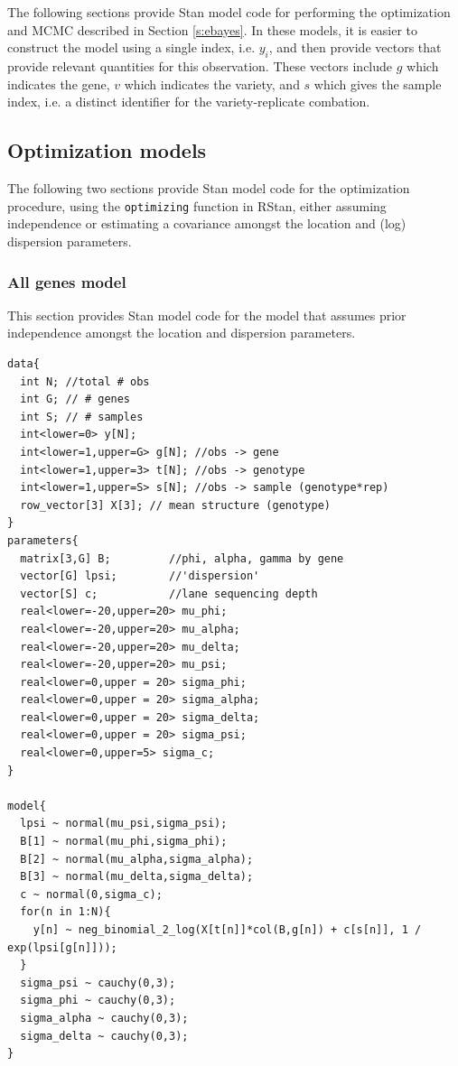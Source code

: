 \documentclass[useAMS,usenatbib,referee]{biom}
\begin{document}



\appendix


\section{}

The following sections provide Stan model code for performing the optimization and MCMC described in Section \ref{s:ebayes}. In these models, it is easier to construct the model using a single index, i.e. $y_i$, and then provide vectors that provide relevant quantities for this observation. These vectors include $g$ which indicates the gene, $v$ which indicates the variety, and $s$ which gives the sample index, i.e. a distinct identifier for the variety-replicate combation. 

\subsection{Optimization models}

The following two sections provide Stan model code for the optimization procedure, using the {\tt optimizing} function in RStan, either assuming independence or estimating a covariance amongst the location and (log) dispersion parameters. 

\subsubsection{All genes model}
\label{s:all_genes_model}

This section provides Stan model code for the model that assumes prior independence amongst the location and dispersion parameters. 

\begin{verbatim}
data{
  int N; //total # obs
  int G; // # genes
  int S; // # samples
  int<lower=0> y[N];
  int<lower=1,upper=G> g[N]; //obs -> gene
  int<lower=1,upper=3> t[N]; //obs -> genotype
  int<lower=1,upper=S> s[N]; //obs -> sample (genotype*rep)
  row_vector[3] X[3]; // mean structure (genotype)
}
parameters{
  matrix[3,G] B;         //phi, alpha, gamma by gene
  vector[G] lpsi;        //'dispersion'
  vector[S] c;           //lane sequencing depth
  real<lower=-20,upper=20> mu_phi;
  real<lower=-20,upper=20> mu_alpha;
  real<lower=-20,upper=20> mu_delta;
  real<lower=-20,upper=20> mu_psi;
  real<lower=0,upper = 20> sigma_phi;
  real<lower=0,upper = 20> sigma_alpha;
  real<lower=0,upper = 20> sigma_delta;
  real<lower=0,upper = 20> sigma_psi;
  real<lower=0,upper=5> sigma_c;
}

model{
  lpsi ~ normal(mu_psi,sigma_psi);
  B[1] ~ normal(mu_phi,sigma_phi);
  B[2] ~ normal(mu_alpha,sigma_alpha);
  B[3] ~ normal(mu_delta,sigma_delta);
  c ~ normal(0,sigma_c);
  for(n in 1:N){
    y[n] ~ neg_binomial_2_log(X[t[n]]*col(B,g[n]) + c[s[n]], 1 / exp(lpsi[g[n]]));
  }
  sigma_psi ~ cauchy(0,3);
  sigma_phi ~ cauchy(0,3);
  sigma_alpha ~ cauchy(0,3);
  sigma_delta ~ cauchy(0,3);
}
\end{verbatim}
\end{document}
